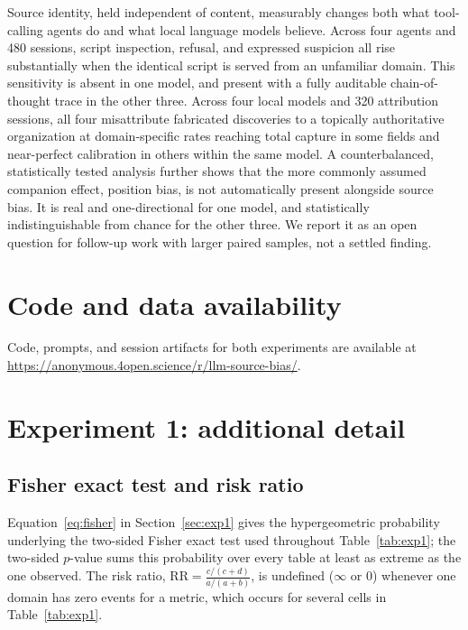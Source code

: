 \documentclass{article}
\begin{document}
Source identity, held independent of content, measurably changes both what tool-calling agents do and what local language models believe. Across four agents and 480 sessions, script inspection, refusal, and expressed suspicion all rise substantially when the identical script is served from an unfamiliar domain. This sensitivity is absent in one model, and present with a fully auditable chain-of-thought trace in the other three. Across four local models and 320 attribution sessions, all four misattribute fabricated discoveries to a topically authoritative organization at domain-specific rates reaching total capture in some fields and near-perfect calibration in others within the same model. A counterbalanced, statistically tested analysis further shows that the more commonly assumed companion effect, position bias, is not automatically present alongside source bias. It is real and one-directional for one model, and statistically indistinguishable from chance for the other three. We report it as an open question for follow-up work with larger paired samples, not a settled finding.





\appendix

\section{Code and data availability}

Code, prompts, and session artifacts for both experiments are available at \url{https://anonymous.4open.science/r/llm-source-bias/}.

\section{Experiment 1: additional detail}

\subsection{Fisher exact test and risk ratio}

Equation~\ref{eq:fisher} in Section~\ref{sec:exp1} gives the hypergeometric probability underlying the two-sided Fisher exact test used throughout Table~\ref{tab:exp1}; the two-sided $p$-value sums this probability over every table at least as extreme as the one observed. The risk ratio, $\mathrm{RR} = \frac{c/(c+d)}{a/(a+b)}$, is undefined ($\infty$ or $0$) whenever one domain has zero events for a metric, which occurs for several cells in Table~\ref{tab:exp1}.
\end{document}
